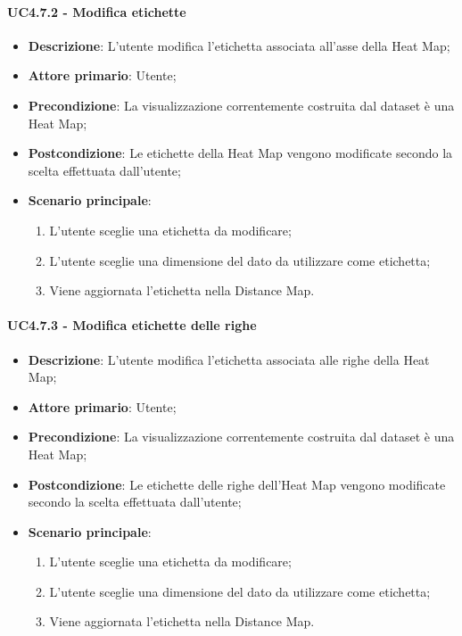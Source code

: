 \paragraph{UC4.7.2 - Modifica etichette}
\label{par:uc4.7.2}
\begin{itemize}
    \item \textbf{Descrizione}:     L'utente modifica l'etichetta associata all'asse della Heat Map;
    \item \textbf{Attore primario}: Utente;
    \item \textbf{Precondizione}:   La visualizzazione correntemente costruita dal dataset è una Heat Map;
    \item \textbf{Postcondizione}:  Le etichette della Heat Map vengono modificate secondo la scelta effettuata dall'utente;
    \item \textbf{Scenario principale}:
    \begin{enumerate}
        \item L'utente sceglie una etichetta da modificare;
        \item L'utente sceglie una dimensione del dato da utilizzare come etichetta;
        \item Viene aggiornata l'etichetta nella Distance Map.
    \end{enumerate}
\end{itemize}

\paragraph{UC4.7.3 - Modifica etichette delle righe}
\label{par:uc4.7.3}
\begin{itemize}
    \item \textbf{Descrizione}:     L'utente modifica l'etichetta associata alle righe della Heat Map;
    \item \textbf{Attore primario}: Utente;
    \item \textbf{Precondizione}:   La visualizzazione correntemente costruita dal dataset è una Heat Map;
    \item \textbf{Postcondizione}:  Le etichette delle righe dell'Heat Map vengono modificate secondo la scelta effettuata dall'utente;
    \item \textbf{Scenario principale}:
    \begin{enumerate}
        \item L'utente sceglie una etichetta da modificare;
        \item L'utente sceglie una dimensione del dato da utilizzare come etichetta;
        \item Viene aggiornata l'etichetta nella Distance Map.
    \end{enumerate}
\end{itemize}

